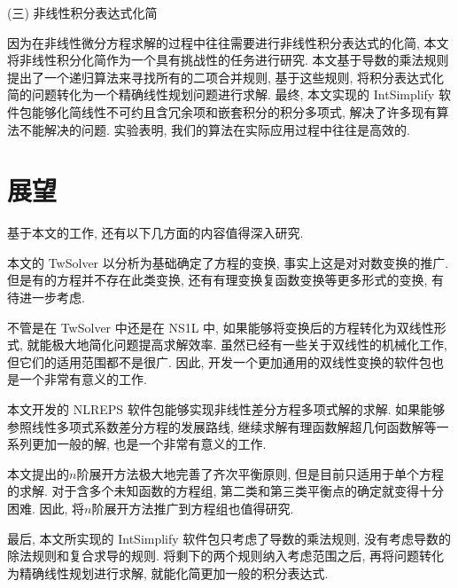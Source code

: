(三) 非线性积分表达式化简

因为在非线性微分方程求解的过程中往往需要进行非线性积分表达式的化简, 本文将非线性积分化简作为一个具有挑战性的任务进行研究. 本文基于导数的乘法规则提出了一个递归算法来寻找所有的二项合并规则, 基于这些规则, 将积分表达式化简的问题转化为一个精确线性规划问题进行求解. 最终, 本文实现的 IntSimplify 软件包能够化简线性不可约且含冗余项和嵌套积分的积分多项式, 解决了许多现有算法不能解决的问题. 实验表明, 我们的算法在实际应用过程中往往是高效的. 

\section{展望}
基于本文的工作, 还有以下几方面的内容值得深入研究.
\begin{compactenum}[(1)]
\item 本文的 TwSolver 以\Painleve{}分析为基础确定了方程的变换, 事实上这是对对数变换的推广. 但是有的方程并不存在此类变换, 还有有理变换\D 复函数变换等更多形式的变换, 有待进一步考虑.
\item 不管是在 TwSolver 中还是在 NS1L 中, 如果能够将变换后的方程转化为双线性形式, 就能极大地简化问题\D 提高求解效率. 虽然已经有一些关于双线性的机械化工作, 但它们的适用范围都不是很广. 因此, 开发一个更加通用的双线性变换的软件包也是一个非常有意义的工作.
\item 本文开发的 NLREPS 软件包能够实现非线性差分方程多项式解的求解. 如果能够参照线性多项式系数差分方程的发展路线, 继续求解有理函数解\D 超几何函数解等一系列更加一般的解, 也是一个非常有意义的工作. 
\item 本文提出的$n$阶展开方法极大地完善了齐次平衡原则, 但是目前只适用于单个方程的求解. 对于含多个未知函数的方程组, 第二类和第三类平衡点的确定就变得十分困难. 因此, 将$n$阶展开方法推广到方程组也值得研究.
\item 最后, 本文所实现的 IntSimplify 软件包只考虑了导数的乘法规则, 没有考虑导数的除法规则和复合求导的规则. 将剩下的两个规则纳入考虑范围之后, 再将问题转化为精确线性规划进行求解, 就能化简更加一般的积分表达式. 
\end{compactenum}
